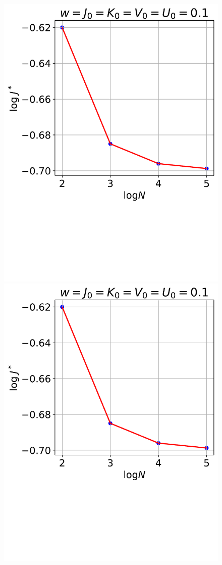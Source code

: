 \documentclass[12pt,twoside]{article}
\numberwithin{equation}{section}
\begin{document}
\begin{figure}[htpb!]
\centering
\includegraphics[scale=0.39]{../figures/J_vs_D_q2.pdf}
\includegraphics[scale=0.39]{../figures/J_vs_D_q4.pdf}

\end{figure}
\end{document}
